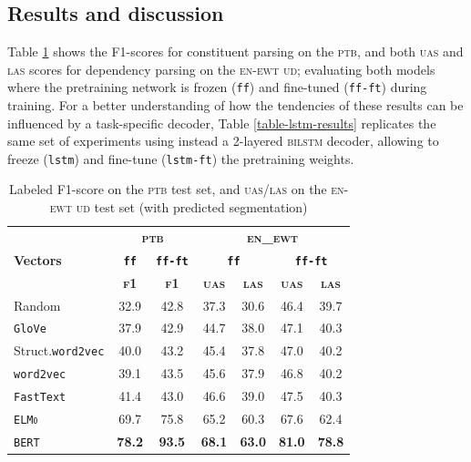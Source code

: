 \documentclass[letterpaper]{article} %
\newcommand{\wordvec}{\texttt{word2vec}}
\newcommand{\fastext}{\texttt{FastText}}
\newcommand{\glove}{\texttt{\textsc{G}lo\textsc{V}e}}
\newcommand{\elmo}{\texttt{\textsc{ELMo}}}
\newcommand{\bert}{\texttt{\textsc{BERT}}}
\begin{document}
\subsection{Results and discussion}

Table \ref{table-const-f1-score} shows the  F1-scores for constituent parsing on the \textsc{ptb}, and both \textsc{uas} and \textsc{las} scores for dependency parsing on the \textsc{en-ewt ud}; evaluating both models where the pretraining network is frozen (\texttt{ff}) and fine-tuned (\texttt{ff-ft}) during training. For a better understanding of how the tendencies of these results can be influenced by a task-specific decoder, Table \ref{table-lstm-results} replicates the same set of experiments using instead a 2-layered \textsc{bilstm} decoder, allowing to freeze (\texttt{lstm}) and fine-tune (\texttt{lstm-ft}) the pretraining weights.

\begin{table}[hbtp]
\tabcolsep=0.12cm
\centering
\small{
\begin{tabular}{l|cc|cccc}

\hline
& \multicolumn{2}{c|}{\bf \textsc{ptb}}&\multicolumn{4}{c}{\bf \textsc{en\_ewt}}\\
\bf Vectors & \bf \texttt{ff} & \bf \texttt{ff-ft} &\multicolumn{2}{c}{\bf \texttt{ff}} & \multicolumn{2}{c}{\bf \texttt{ff-ft}} \\
&\bf \textsc{f1}&\bf \textsc{f1}&\bf \textsc{uas} & \bf \textsc{las} & \bf \textsc{uas} & \bf \textsc{las}  \\
\hline
Random&32.9&42.8&37.3&30.6&46.4&39.7\\
\glove &37.9&42.9&44.7&38.0&47.1&40.3\\
Struct.\wordvec&40.0&43.2&45.4&37.8&47.0&40.2\\
\wordvec&39.1&43.5&45.6&37.9&46.8&40.2\\
\fastext&41.4&43.0&46.6&39.0&47.5&40.3\\
\elmo&69.7&75.8&65.2&60.3&67.6&62.4\\
\bert&\bf 78.2&\bf 93.5&\bf 68.1&\bf 63.0&\bf 81.0&\bf 78.8\\
\hline
\end{tabular}
}
\caption{Labeled F1-score on the \textsc{ptb} test set, and {\textsc{uas/las} on the \textsc{en-ewt ud} test set (with predicted segmentation)}\label{table-const-f1-score}}
\end{table}
\end{document}
